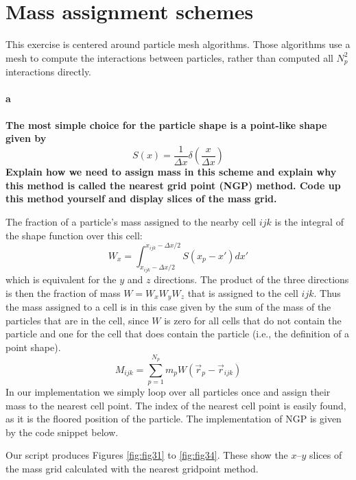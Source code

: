 \section{Mass assignment schemes}
This exercise is centered around particle mesh algorithms. Those algorithms use a mesh to compute the interactions between particles, rather than computed all $N_p^2$ interactions directly. 

\paragraph{a} \textbf{The most simple choice for the particle shape is a point-like shape given by}
\begin{equation}
S(x) = \frac{1}{\Delta x} \delta(\frac{x}{\Delta x})
\end{equation}
\textbf{Explain how we need to assign mass in this scheme and explain why this method is called the nearest grid point (NGP) method. Code up this method yourself and display slices of the mass grid.}


The fraction of a particle's mass assigned to the nearby cell $ijk$ is the integral of the shape function over this cell:
\begin{equation}\label{eq:weight}
W_x = \int_{x_{ijk} - \Delta x /2}^{x_{ijk} - \Delta x /2} S(x_p - x') dx'
\end{equation}
which is equivalent for the $y$ and $z$ directions. The product of the three directions is then the fraction of mass $W=W_xW_yW_z$ that is assigned to the cell $ijk$. Thus the mass assigned to a cell is in this case given by the sum of the mass of the particles that are in the cell, since $W$ is zero for all cells that do not contain the particle and one for the cell that does contain the particle (i.e., the definition of a point shape).
\begin{equation}
M_{ijk} = \sum_{p=1}^{N_p} m_p W(\vec{r}_p - \vec{r}_{ijk}) 
\end{equation}
In our implementation we simply loop over all particles once and assign their mass to the nearest cell point. The index of the nearest cell point is easily found, as it is the floored position of the particle. The implementation of NGP is given by the code snippet below.




Our script produces Figures \ref{fig:fig31} to \ref{fig:fig34}. These show the $x$--$y$ slices of the mass grid calculated with the nearest gridpoint method. 

